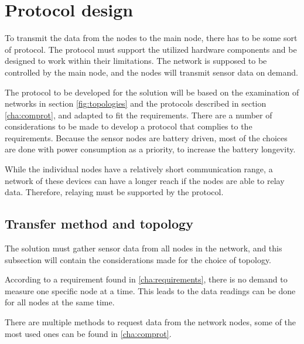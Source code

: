\section{Protocol design}\label{cha:protocolDesign}

To transmit the data from the nodes to the main node, there has to be some sort of protocol. The protocol must support the utilized hardware components and be designed to work within their limitations. The network is supposed to be controlled by the main node, and the nodes will transmit sensor data on demand.

The protocol to be developed for the solution will be based on the examination of networks in section \ref{fig:topologies} and the protocols described in section \ref{cha:comprot}, and adapted to fit the requirements. There are a number of considerations to be made to develop a protocol that complies to the requirements. Because the sensor nodes are battery driven, most of the choices are done with power consumption as a priority, to increase the battery longevity.

While the individual nodes have a relatively short communication range, a network of these devices can have a longer reach if the nodes are able to relay data. Therefore, relaying must be supported by the protocol. 

\subsection{Transfer method and topology}
The solution must gather sensor data from all nodes in the network, and this subsection will contain the considerations made for the choice of topology.

According to a requirement found in \ref{cha:requirements}, there is no demand to measure one specific node at a time. This leads to the data readings can be done for all nodes at the same time. 

There are multiple methods to request data from the network nodes, some of the most used ones can be found in \ref{cha:comprot}. 

